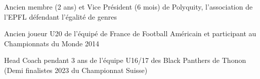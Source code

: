 


\begin{cventries}
	
	
	\cventry
	{} %
	{}
	{}
	{}
	{ %
		\begin{cvitems}
			\item {Ancien membre (2 ans) et Vice Président (6 mois) de Polyquity, l'association de l'EPFL défendant l'égalité de genres}
			\item {Ancien joueur U20 de l'équipé de France de Football Américain et participant au Championnats du Monde 2014}
			\item {Head Coach pendant 3 ans de l'équipe U16/17 des Black Panthers de Thonon (Demi finalistes 2023 du Championnat Suisse)}
		\end{cvitems}
	}
	
	
	
	
\end{cventries}